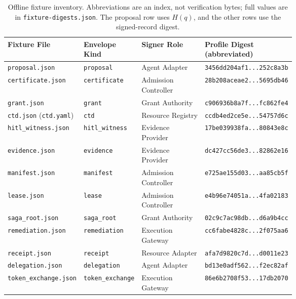 \small
\begin{table}[!ht]
\centering
\begin{tabularx}{\linewidth}{L{0.24\linewidth}L{0.18\linewidth}L{0.24\linewidth}X}
\toprule
\textbf{Fixture File} & \textbf{Envelope Kind} & \textbf{Signer Role} & \textbf{Profile Digest (abbreviated)}\\
\midrule
\texttt{proposal.json} & \texttt{proposal} & Agent Adapter & \texttt{3456dd204af1...252c8a3b} \\
\texttt{certificate.json} & \texttt{certificate} & Admission Controller & \texttt{28b208aceae2...5695db46} \\
\texttt{grant.json} & \texttt{grant} & Grant Authority & \texttt{c906936b8a7f...fc862fe4} \\
\texttt{ctd.json} (\texttt{ctd.yaml}) & \texttt{ctd} & Resource Registry & \texttt{ccdb4ed2ce5e...54757d6c} \\
\texttt{hitl\_witness.json} & \texttt{hitl\_witness} & Evidence Provider & \texttt{17be039938fa...80843e8c} \\
\texttt{evidence.json} & \texttt{evidence} & Evidence Provider & \texttt{dc427cc56de3...82862e16} \\
\texttt{manifest.json} & \texttt{manifest} & Admission Controller & \texttt{e725ae155d03...aa85cb5f} \\
\texttt{lease.json} & \texttt{lease} & Admission Controller & \texttt{e4b96e74051a...4fa02183} \\
\texttt{saga\_root.json} & \texttt{saga\_root} & Grant Authority & \texttt{02c9c7ac98db...d6a9b4cc} \\
\texttt{remediation.json} & \texttt{remediation} & Execution Gateway & \texttt{cc6fabe4828c...2f075aa6} \\
\texttt{receipt.json} & \texttt{receipt} & Resource Adapter & \texttt{afa7d9820c7d...d0011e23} \\
\texttt{delegation.json} & \texttt{delegation} & Agent Adapter & \texttt{bd13e0adf562...f2ec82af} \\
\texttt{token\_exchange.json} & \texttt{token\_exchange} & Execution Gateway & \texttt{86e6b2708f53...17db2070} \\
\bottomrule
\end{tabularx}
\caption{Offline fixture inventory. Abbreviations are an index, not verification bytes; full values are in \texttt{fixture-digests.json}. The proposal row uses $H(q)$, and the other rows use the signed-record digest.}
\label{tab:fixture-listings}
\end{table}
\normalsize

